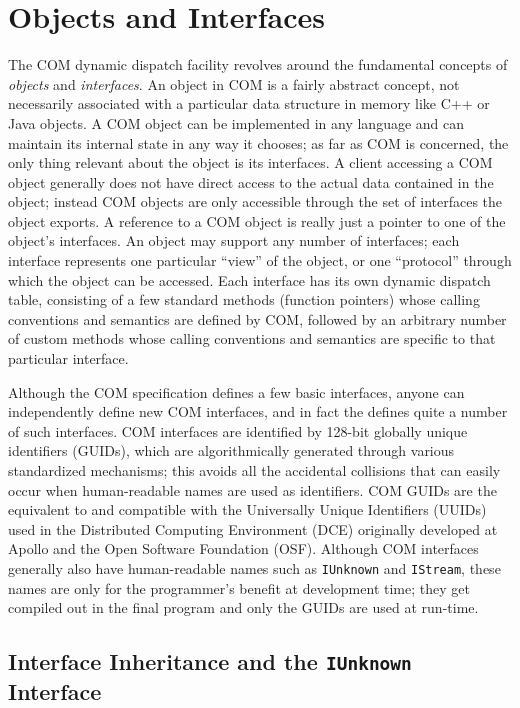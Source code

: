 \section{Objects and Interfaces}

The COM dynamic dispatch facility
revolves around the fundamental concepts
of \emph{objects} and \emph{interfaces}.
An object in COM is a fairly abstract concept,
not necessarily associated with a particular data structure in memory
like C++ or Java objects.
A COM object can be implemented in any language
and can maintain its internal state in any way it chooses;
as far as COM is concerned,
the only thing relevant about the object is its interfaces.
A client accessing a COM object
generally does not have direct access
to the actual data contained in the object;
instead COM objects are only accessible
through the set of interfaces the object exports.
A reference to a COM object
is really just a pointer to one of the object's interfaces.
An object may support any number of interfaces;
each interface represents one particular ``view'' of the object,
or one ``protocol'' through which the object can be accessed.
Each interface has its own dynamic dispatch table,
consisting of a few standard methods (function pointers)
whose calling conventions and semantics are defined by COM,
followed by an arbitrary number of custom methods
whose calling conventions and semantics are specific
to that particular interface.

Although the COM specification defines a few basic interfaces,
anyone can independently define new COM interfaces,
and in fact the \oskit{} defines quite a number of such interfaces.
COM interfaces are identified by 128-bit globally unique identifiers (GUIDs),
which are algorithmically generated through various standardized mechanisms;
this avoids all the accidental collisions that can easily occur
when human-readable names are used as identifiers.
COM GUIDs are the equivalent to and compatible with
the Universally Unique Identifiers (UUIDs)
used in the Distributed Computing Environment (DCE)
originally developed at Apollo and the Open Software Foundation (OSF).
Although COM interfaces generally also have human-readable names
such as \texttt{IUnknown} and \texttt{IStream},
these names are only for the programmer's benefit at development time;
they get compiled out in the final program
and only the GUIDs are used at run-time.

\subsection{Interface Inheritance and the \texttt{IUnknown} Interface}


